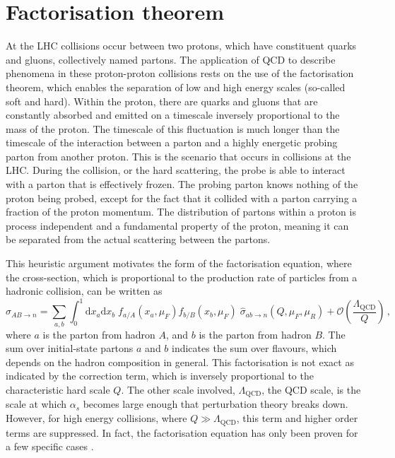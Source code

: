 \documentclass[main.tex]{subfiles}
\begin{document}
\section{Factorisation theorem}\label{sec:factorisation}
    At the LHC collisions occur between two protons,
    which have constituent quarks and gluons, collectively
    named partons.
    The application of QCD to describe phenomena
    in these proton-proton collisions rests on the use of
    the factorisation theorem, which enables the
    separation of low and high energy scales (so-called soft and hard).
    Within the proton, there are quarks
    and gluons that are constantly absorbed and
    emitted on a timescale inversely proportional
    to the mass of the proton.
    The timescale of this fluctuation is much longer
    than the timescale of the interaction between
    a parton and a highly energetic probing parton
    from another proton. This is the scenario
    that occurs in collisions at the LHC.
    During the collision, or the hard scattering,
    the probe is able to interact with a
    parton that is effectively frozen.
    The probing parton knows nothing of the
    proton being probed, except for the fact
    that it collided with a parton carrying
    a fraction of the proton momentum. The
    distribution of partons within a proton
    is process independent and a fundamental
    property of the proton, meaning it can be
    separated from the actual scattering between
    the partons.

    This heuristic argument motivates the form of
    the factorisation equation, where the cross-section,
    which is proportional to the production rate of
    particles from a hadronic collision, can be written as
    \begin{equation}\label{eqn:hadronic_cs}
        \sigma_{AB \rightarrow n} = \sum_{a, b}\int_{0}^{1} \mathrm{d}x_{a}\mathrm{d}x_{b} \; f_{a/A}(x_{a},\mu_{F})f_{b/B}(x_{b}, \mu_{F}) \; \hat{\sigma}_{ab \rightarrow n}(Q, \mu_{F}, \mu_{R}) + \mathcal{O}\left(\dfrac{\Lambda_{\mathrm{QCD}}}{Q}\right)\, ,
    \end{equation}
    where $a$ is the parton from hadron $A$,
    and $b$ is the parton from hadron $B$.
    The sum over initial-state partons $a$ and $b$
    indicates the sum over flavours, which depends
    on the hadron composition in general.
    This factorisation is not exact as indicated by the
    correction term, which is inversely proportional to the characteristic
    hard scale $Q$. The other scale involved, $\Lambda_{\mathrm{QCD}}$, the QCD scale,
    is the scale at which $\alpha_{s}$ becomes
    large enough that perturbation theory breaks down.
    However, for high energy collisions, where
    $Q \gg \Lambda_{\mathrm{QCD}}$, this term and higher order
    terms are suppressed.
    In fact, the factorisation equation has only been
    proven for a few specific cases \cite{Collins:2011zzd,Collins:1987pm,Collins:1989gx,Amoroso:2022eow}.
\end{document}
